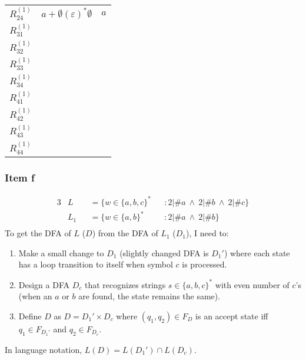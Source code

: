 \documentclass[docid=2017/18]{tcom_exam}
\begin{document}
{\begin{minipage}[c]{0.49\textwidth}
\begin{center}
\begin{tabular}{r || c | c}
			$R_{24}^{(1)}$ & $a+\emptyset(\varepsilon)^*\emptyset$ & $a$ \\ 
			$R_{31}^{(1)}$ &   &   \\
			$R_{32}^{(1)}$ &   &   \\
			$R_{33}^{(1)}$ &   &   \\
			$R_{34}^{(1)}$ &   &   \\
			$R_{41}^{(1)}$ &   &   \\
			$R_{42}^{(1)}$ &   &   \\
			$R_{43}^{(1)}$ &   &   \\
			$R_{44}^{(1)}$ &   &   \\  
		\end{tabular}
	\end{center}
\end{minipage}
\pagebreak
\subsubsection{Item f}
\begin{alignat*}{3}
	&L   &&= \{w \in \{a,b,c\}^* && \colon 2|\#a~\wedge~2|\#b~\wedge~2|\#c\}\\
	&L_1 &&= \{w \in \{a,b\}^* && \colon 2|\#a~\wedge~2|\#b\}\\
\end{alignat*}
To get the DFA of $L$ ($D$) from the DFA of $L_1$ ($D_1$), I need to:
\begin{enumerate}
	\item Make a small change to $D_1$ (slightly changed DFA is $D_1'$) where each state has a loop transition to itself when symbol $c$ is processed.
	\item Design a DFA $D_c$ that recognizes strings $s\in \{a,b,c\}^*$ with even number of $c$'s (when an $a$ or $b$ are found, the state remains the same).
	\item Define $D$ as $D=D_1' \times D_c$ where $(q_1,q_2) \in F_D$ is an accept state iff $q_1 \in F_{D_1'}$ and $q_2 \in F_{D_c}$.
\end{enumerate}
In language notation, $L(D)=L(D_1') \cap L(D_c)$.
}
\end{document}
